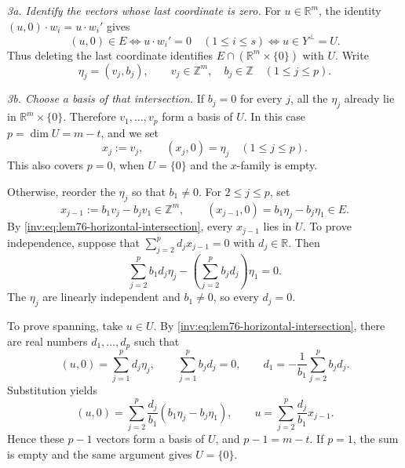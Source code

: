 \documentclass[twoside]{aomart}
\makeatletter
\theoremstyle{paperplain}
\theoremstyle{paperdefinition}
\renewenvironment{proof}[1][\proofname]{\par\pushQED{\qed}%
  \normalfont\topsep6\p@\@plus3\p@\relax\trivlist
  \item[\hskip\labelsep\itshape #1\@addpunct{.}]\ignorespaces
}{\popQED\endtrivlist\@endpefalse}
\numberwithin{equation}{section}
\makeatother
\begin{document}
\begin{proof}
\smallskip
\noindent\emph{3a. Identify the vectors whose last coordinate is zero.}
For $u\in\mathbb R^m$, the identity
$(u,0)\cdot w_i=u\cdot w_i'$ gives
\begin{equation}
 (u,0)\in E\iff u\cdot w_i'=0\quad(1\le i\le s)
 \iff u\in Y^\perp=U.
 \label{inv:eq:lem76-horizontal-intersection}
\end{equation}
Thus deleting the last coordinate identifies
$E\cap(\mathbb R^m\times\{0\})$ with $U$.
Write
\begin{equation*}
 \eta_j=(v_j,b_j),\qquad v_j\in\mathbb Z^m,\quad b_j\in\mathbb Z
 \quad(1\le j\le p).
\end{equation*}

\smallskip
\noindent\emph{3b. Choose a basis of that intersection.}
If $b_j=0$ for every $j$, all the $\eta_j$ already lie in
$\mathbb R^m\times\{0\}$. Therefore $v_1,\ldots,v_p$ form a basis of
$U$. In this case $p=\dim U=m-t$, and we set
\begin{equation}
 x_j:=v_j,\qquad (x_j,0)=\eta_j\quad(1\le j\le p).
 \label{inv:eq:lem76-zero-last-coordinate}
\end{equation}
This also covers $p=0$, when $U=\{0\}$ and the $x$-family is empty.

Otherwise, reorder the $\eta_j$ so that $b_1\ne0$. For $2\le j\le p$,
set
\begin{equation}
 x_{j-1}:=b_1v_j-b_jv_1\in\mathbb Z^m,\qquad
 (x_{j-1},0)=b_1\eta_j-b_j\eta_1\in E.
 \label{inv:eq:lem76-coordinate-elimination}
\end{equation}
By \eqref{inv:eq:lem76-horizontal-intersection}, every $x_{j-1}$ lies
in $U$. To prove independence, suppose that
$\sum_{j=2}^p d_jx_{j-1}=0$ with $d_j\in\mathbb R$. Then
\begin{equation*}
 \sum_{j=2}^p b_1d_j\eta_j
 -\left(\sum_{j=2}^p b_jd_j\right)\eta_1=0.
\end{equation*}
The $\eta_j$ are linearly independent and $b_1\ne0$, so every $d_j=0$.

To prove spanning, take $u\in U$. By
\eqref{inv:eq:lem76-horizontal-intersection}, there are real numbers
$d_1,\ldots,d_p$ such that
\begin{equation*}
 (u,0)=\sum_{j=1}^p d_j\eta_j,\qquad
 \sum_{j=1}^p b_jd_j=0,\qquad
 d_1=-\frac1{b_1}\sum_{j=2}^p b_jd_j.
\end{equation*}
Substitution yields
\begin{equation*}
 (u,0)=\sum_{j=2}^p\frac{d_j}{b_1}
                  (b_1\eta_j-b_j\eta_1),\qquad
 u=\sum_{j=2}^p\frac{d_j}{b_1}x_{j-1}.
\end{equation*}
Hence these $p-1$ vectors form a basis of $U$, and $p-1=m-t$.
If $p=1$, the sum is empty and the same argument gives $U=\{0\}$.


\end{proof}
\end{document}
